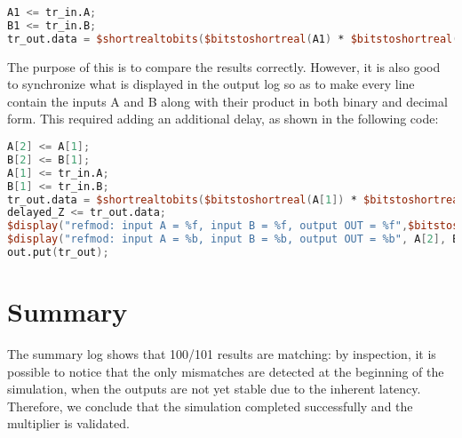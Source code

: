 \begin{lstlisting}[language = verilog]
A1 <= tr_in.A;
B1 <= tr_in.B;
tr_out.data = $shortrealtobits($bitstoshortreal(A1) * $bitstoshortreal(B1));
\end{lstlisting}

The purpose of this is to compare the results correctly. However, it is also good to synchronize what is displayed in the output log so as to make every line contain the inputs A and B along with their product in both binary and decimal form. This required adding an additional delay, as shown in the following code:
\begin{lstlisting}[language = verilog]
A[2] <= A[1];
B[2] <= B[1];
A[1] <= tr_in.A;
B[1] <= tr_in.B;
tr_out.data = $shortrealtobits($bitstoshortreal(A[1]) * $bitstoshortreal(B[1]));
delayed_Z <= tr_out.data;
$display("refmod: input A = %f, input B = %f, output OUT = %f",$bitstoshortreal(A[2]), $bitstoshortreal(B[2]), $bitstoshortreal(delayed_Z));
$display("refmod: input A = %b, input B = %b, output OUT = %b", A[2], B[2], delayed_Z);
out.put(tr_out);
\end{lstlisting}

\section{Summary}
The summary log shows that 100/101 results are matching: by inspection, it is possible to notice that the only mismatches are detected at the beginning of the simulation, when the outputs are not yet stable due to the inherent latency. Therefore, we conclude that the simulation completed successfully and the multiplier is validated.
